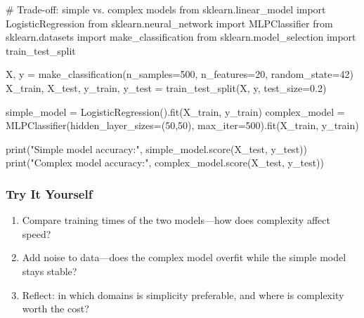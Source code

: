 \documentclass[
  letterpaper,
  DIV=11,
  numbers=noendperiod]{scrreprt}
\newenvironment{Shaded}{\begin{snugshade}}{\end{snugshade}}
\newcommand{\BuiltInTok}[1]{\textcolor[rgb]{0.00,0.23,0.31}{#1}}
\newcommand{\CommentTok}[1]{\textcolor[rgb]{0.37,0.37,0.37}{#1}}
\newcommand{\DecValTok}[1]{\textcolor[rgb]{0.68,0.00,0.00}{#1}}
\newcommand{\FloatTok}[1]{\textcolor[rgb]{0.68,0.00,0.00}{#1}}
\newcommand{\ImportTok}[1]{\textcolor[rgb]{0.00,0.46,0.62}{#1}}
\newcommand{\NormalTok}[1]{\textcolor[rgb]{0.00,0.23,0.31}{#1}}
\newcommand{\OperatorTok}[1]{\textcolor[rgb]{0.37,0.37,0.37}{#1}}
\newcommand{\StringTok}[1]{\textcolor[rgb]{0.13,0.47,0.30}{#1}}
\providecommand{\tightlist}{%
  \setlength{\itemsep}{0pt}\setlength{\parskip}{0pt}}
\begin{document}
\begin{Shaded}
\begin{Highlighting}[]
\CommentTok{\# Trade{-}off: simple vs. complex models}
\ImportTok{from}\NormalTok{ sklearn.linear\_model }\ImportTok{import}\NormalTok{ LogisticRegression}
\ImportTok{from}\NormalTok{ sklearn.neural\_network }\ImportTok{import}\NormalTok{ MLPClassifier}
\ImportTok{from}\NormalTok{ sklearn.datasets }\ImportTok{import}\NormalTok{ make\_classification}
\ImportTok{from}\NormalTok{ sklearn.model\_selection }\ImportTok{import}\NormalTok{ train\_test\_split}

\NormalTok{X, y }\OperatorTok{=}\NormalTok{ make\_classification(n\_samples}\OperatorTok{=}\DecValTok{500}\NormalTok{, n\_features}\OperatorTok{=}\DecValTok{20}\NormalTok{, random\_state}\OperatorTok{=}\DecValTok{42}\NormalTok{)}
\NormalTok{X\_train, X\_test, y\_train, y\_test }\OperatorTok{=}\NormalTok{ train\_test\_split(X, y, test\_size}\OperatorTok{=}\FloatTok{0.2}\NormalTok{)}

\NormalTok{simple\_model }\OperatorTok{=}\NormalTok{ LogisticRegression().fit(X\_train, y\_train)}
\NormalTok{complex\_model }\OperatorTok{=}\NormalTok{ MLPClassifier(hidden\_layer\_sizes}\OperatorTok{=}\NormalTok{(}\DecValTok{50}\NormalTok{,}\DecValTok{50}\NormalTok{), max\_iter}\OperatorTok{=}\DecValTok{500}\NormalTok{).fit(X\_train, y\_train)}

\BuiltInTok{print}\NormalTok{(}\StringTok{"Simple model accuracy:"}\NormalTok{, simple\_model.score(X\_test, y\_test))}
\BuiltInTok{print}\NormalTok{(}\StringTok{"Complex model accuracy:"}\NormalTok{, complex\_model.score(X\_test, y\_test))}
\end{Highlighting}
\end{Shaded}

\subsubsection{Try It Yourself}\label{try-it-yourself-38}

\begin{enumerate}
\def\labelenumi{\arabic{enumi}.}
\tightlist
\item
  Compare training times of the two models---how does complexity affect
  speed?
\item
  Add noise to data---does the complex model overfit while the simple
  model stays stable?
\item
  Reflect: in which domains is simplicity preferable, and where is
  complexity worth the cost?
\end{enumerate}
\end{document}
